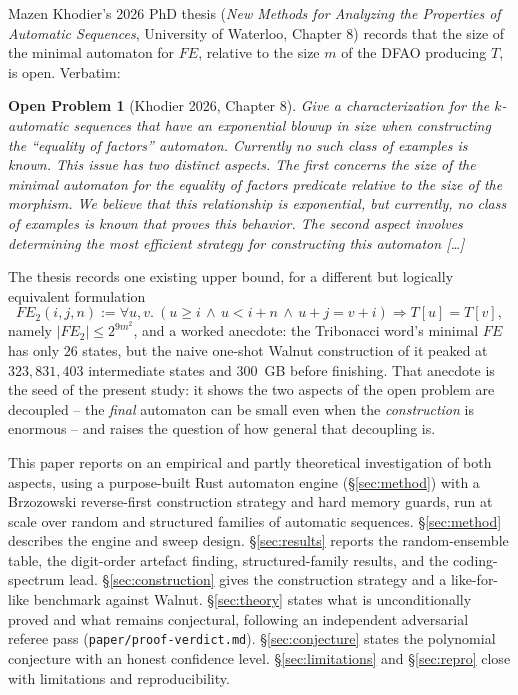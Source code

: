 \documentclass[11pt]{article}
\newtheorem*{openproblem}{Open Problem}
\begin{document}
Mazen Khodier's 2026 PhD thesis (\emph{New Methods for Analyzing the Properties of
Automatic Sequences}, University of Waterloo, Chapter 8) records that the size of the
minimal automaton for $FE$, relative to the size $m$ of the DFAO producing $T$, is open.
Verbatim:

\begin{openproblem}[Khodier 2026, Chapter 8]
Give a characterization for the $k$-automatic sequences that have an exponential blowup
in size when constructing the ``equality of factors'' automaton. Currently no such class
of examples is known.
This issue has two distinct aspects. The first concerns the size of the minimal
automaton for the equality of factors predicate relative to the size of the morphism.
We believe that this relationship is exponential, but currently, no class of examples
is known that proves this behavior. The second aspect involves determining the most
efficient strategy for constructing this automaton [\ldots]
\end{openproblem}

The thesis records one existing upper bound, for a different but logically equivalent
formulation
$$FE_2(i,j,n) := \forall u,v.\ (u\ge i \,\wedge\, u<i+n \,\wedge\, u+j=v+i) \Rightarrow T[u]=T[v],$$
namely $|FE_2|\le 2^{9m^2}$, and a worked anecdote: the Tribonacci word's minimal $FE$
has only $26$ states, but the naive one-shot Walnut construction of it peaked at
$323{,}831{,}403$ intermediate states and $300$~GB before finishing. That anecdote is the
seed of the present study: it shows the two aspects of the open problem are decoupled --
the \emph{final} automaton can be small even when the \emph{construction} is enormous --
and raises the question of how general that decoupling is.

This paper reports on an empirical and partly theoretical investigation of both aspects,
using a purpose-built Rust automaton engine (\S\ref{sec:method}) with a Brzozowski
reverse-first construction strategy and hard memory guards, run at scale over random and
structured families of automatic sequences. \S\ref{sec:method} describes the engine and
sweep design. \S\ref{sec:results} reports the random-ensemble table, the digit-order
artefact finding, structured-family results, and the coding-spectrum lead. \S\ref{sec:construction}
gives the construction strategy and a like-for-like benchmark against Walnut.
\S\ref{sec:theory} states what is unconditionally proved and what remains conjectural,
following an independent adversarial referee pass (\texttt{paper/proof-verdict.md}).
\S\ref{sec:conjecture} states the polynomial conjecture with an honest confidence level.
\S\ref{sec:limitations} and \S\ref{sec:repro} close with limitations and reproducibility.
\end{document}
